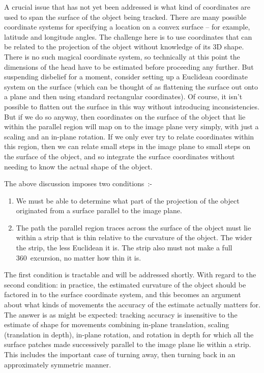 A crucial issue that has not yet been addressed is what kind of
coordinates are used to span the surface of the object being tracked.
There are many possible coordinate systems for specifying a location
on a convex surface -- for example, latitude and longitude angles.
The challenge here is to use coordinates that can be related to the
projection of the object without knowledge of its 3D shape.  There is
no such magical coordinate system, so technically at this point the
dimensions of the head have to be estimated before proceeding any
further.  But suspending disbelief for a moment, consider setting up a
Euclidean coordinate system on the surface (which can be thought of as
flattening the surface out onto a plane and then using standard
rectangular coordinates).  Of course, it isn't possible to flatten out
the surface in this way without introducing inconsistencies.  But if
we do so anyway, then coordinates on the surface of the object that
lie within the parallel region will map on to the image plane very
simply, with just a scaling and an in-plane rotation.  If we only ever
try to relate coordinates within this region, then we can relate small
steps in the image plane to small steps on the surface of the object, and
so integrate the surface coordinates without needing to know the
actual shape of the object.

The above discussion imposes two conditions~:-

\begin{enumerate}

\item We must be able to determine what part of the projection of the
object originated from a surface parallel to the image plane.

\item The path the parallel region traces across the surface of the
object must lie within a strip that is thin relative to the curvature
of the object.  The wider the strip, the less Euclidean it is.  The
strip also must not make a full 360\dgrs\ excursion, no matter how
thin it is.  

\end{enumerate}

The first condition is tractable and will be addressed shortly.  With
regard to the second condition: in practice, the estimated curvature
of the object should be factored in to the surface coordinate system,
and this becomes an argument about what kinds of movements the
accuracy of the estimate actually matters for.  The answer is as might
be expected: tracking accuracy is insensitive to the estimate of shape
for movements combining in-plane translation, scaling (translation in
depth), in-plane rotation, and rotation in depth for which all the
surface patches made successively parallel to the image plane lie
within a strip.  This includes the important case of turning away,
then turning back in an approximately symmetric manner.


